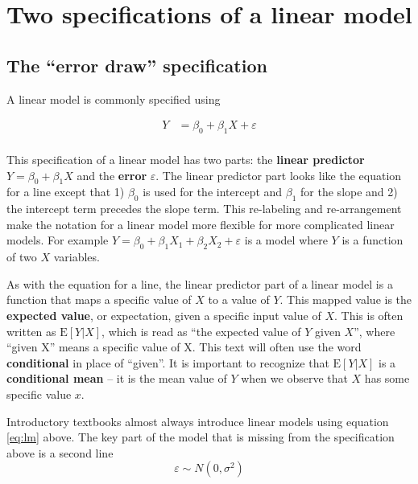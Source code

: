 \documentclass[]{book}
\begin{document}
\hypertarget{two-specifications-of-a-linear-model}{%
\section{Two specifications of a linear model}\label{two-specifications-of-a-linear-model}}

\hypertarget{the-error-draw-specification}{%
\subsection{The ``error draw'' specification}\label{the-error-draw-specification}}

A linear model is commonly specified using

\begin{align}
Y &= \beta_0 + \beta_1 X + \varepsilon\\
\label{eq:lm}
\end{align}

This specification of a linear model has two parts: the \textbf{linear predictor} \(Y = \beta_0 + \beta_1 X\) and the \textbf{error} \(\varepsilon\). The linear predictor part looks like the equation for a line except that 1) \(\beta_0\) is used for the intercept and \(\beta_1\) for the slope and 2) the intercept term precedes the slope term. This re-labeling and re-arrangement make the notation for a linear model more flexible for more complicated linear models. For example \(Y = \beta_0 + \beta_1 X_1 + \beta_2 X_2 + \varepsilon\) is a model where \(Y\) is a function of two \(X\) variables.

As with the equation for a line, the linear predictor part of a linear model is a function that maps a specific value of \(X\) to a value of \(Y\). This mapped value is the \textbf{expected value}, or expectation, given a specific input value of \(X\). This is often written as \(\mathrm{E}[Y|X]\), which is read as ``the expected value of \(Y\) given \(X\)'', where ``given X'' means a specific value of X. This text will often use the word \textbf{conditional} in place of ``given''. It is important to recognize that \(\mathrm{E}[Y|X]\) is a \textbf{conditional mean} -- it is the mean value of \(Y\) when we observe that \(X\) has some specific value \(x\).

Introductory textbooks almost always introduce linear models using equation \eqref{eq:lm} above. The key part of the model that is missing from the specification above is a second line
\begin{equation}
\varepsilon \sim N(0, \sigma^2)
\end{equation}
\end{document}

